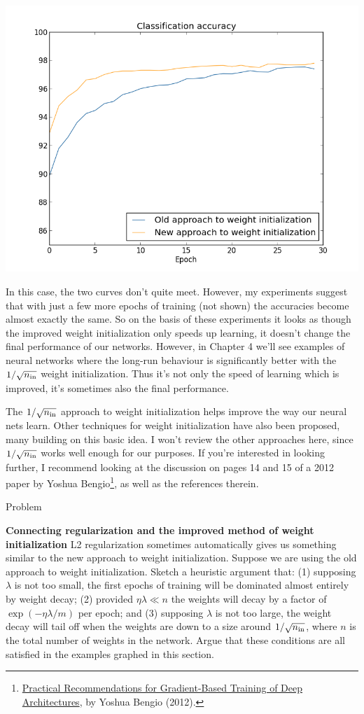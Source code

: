 \documentclass[a4paper,twoside,10pt]{book}
\begin{document}
\begin{center}
	\includegraphics[width=0.6\linewidth]{figures/ch3/weight_initialization_100}
\end{center}
In this case, the two curves don't quite meet. However, my experiments suggest that with just a few more epochs of training (not shown) the accuracies become almost exactly the same. So on the basis of these experiments it looks as though the improved weight initialization only speeds up learning, it doesn't change the final performance of our networks. However, in Chapter 4 we'll see examples of neural networks where the long-run behaviour is significantly better with the $1/\sqrt{n_{\rm in}}$ weight initialization. Thus it's not only the speed of learning which is improved, it's sometimes also the final performance.

The $1/\sqrt{n_{\rm in}}$ approach to weight initialization helps improve the way our neural nets learn. Other techniques for weight initialization have also been proposed, many building on this basic idea. I won't review the other approaches here, since $1/\sqrt{n_{\rm in}}$ works well enough for our purposes. If you're interested in looking further, I recommend looking at the discussion on pages 14 and 15 of a 2012 paper by Yoshua Bengio\footnote{\href{http://arxiv.org/pdf/1206.5533v2.pdf}{Practical Recommendations for Gradient-Based Training of Deep Architectures}, by Yoshua Bengio (2012).}, as well as the references therein.

\begin{exercize}{Problem}
	\item \textbf{Connecting regularization and the improved method of weight initialization} L2 regularization sometimes automatically gives us something similar to the new approach to weight initialization. Suppose we are using the old approach to weight initialization. Sketch a heuristic argument that: (1) supposing $\lambda$ is not too small, the first epochs of training will be dominated almost entirely by weight decay; (2) provided $\eta\lambda\ll n$ the weights will decay by a factor of $\exp(-\eta\lambda/m)$ per epoch; and (3) supposing $\lambda$ is not too large, the weight decay will tail off when the weights are down to a size around $1/\sqrt{n_{\rm in}}$, where $n$ is the total number of weights in the network. Argue that these conditions are all satisfied in the examples graphed in this section.
	\end{exercize}
\end{document}
